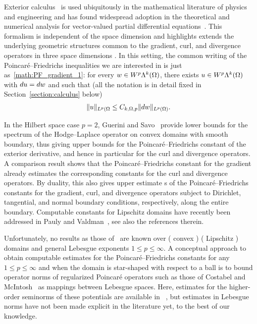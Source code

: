 \documentclass[10pt,letterpaper]{article}
\newcommand\cye[1]{%
  \protect\leavevmode
  \begingroup
    \color{red!35!yellow}%
    #1%
  \endgroup
}
\begin{document}
Exterior calculus~\cite{greub1967multilinear,lee2012smooth} is used ubiquitously in the mathematical literature of physics and engineering and has found widespread adoption in the theoretical and numerical analysis for vector-valued partial differential equations~\cite{hiptmair2002finite, gross2004electromagnetic, arnold2006finite, arnold2009geometric, arnold2010finite, demlow2014posteriori, licht2021local, arnold2021complexes}. 
This formalism is independent of the \cye{space} dimension and highlights \cye{extends the} underlying geometric structures common to the gradient, curl, and divergence operators \cye{in three space dimensions}.
\cye{In this setting, the common writing of the Poincar\'e--Friedrichs inequalities we are interested in is just as~\eqref{math:PF_gradient_1}: for every $w \in W^{p}\Lambda^{k}(\Omega)$, there exists $u \in W^{p}\Lambda^{k}(\Omega)$ with $d u = d w$ and such that (all the notation is in detail fixed in Section~\ref{section:calculus} below)
\begin{align} \label{math:PF_DF} 
    \| u \|_{L^{p}(\Omega} \leq  C_{k,\Omega,p} \| d w \|_{L^{p}(\Omega)}.
\end{align} 
}

In the Hilbert space case $p=2$, Guerini and Savo~\cite{guerini2004eigenvalue} provide lower bounds for the spectrum of the Hodge--Laplace operator on convex domains with smooth boundary, thus giving upper bounds for the Poincar\'e--Friedrichs constant of the exterior derivative, and hence \cye{in particular} for the curl and divergence operators.
\cye{A comparison result} shows that the Poincar\'e--Friedrichs constant for the gradient already estimates the corresponding constants for the curl and divergence operators. By duality, this also \cye{gives} upper estimate\cye{s} of the Poincar\'e--Friedrichs constants for the gradient, curl, and divergence \cye{operators} subject to Dirichlet, tangential, and normal boundary conditions, respectively, along the entire boundary. 
\cye{Computable constants for Lipschitz domains have recently been addressed in Pauly and Valdman~\cite{Paul_Vald_PF_grad_curl_div_20}, see also the references therein.}

Unfortunately, no results as those of~\cite{guerini2004eigenvalue, Paul_Vald_PF_grad_curl_div_20} are known over \cye{(}convex\cye{)} \cye{(}Lipschitz\cye{)} domains and general Lebesgue exponents $1 \leq p \leq \infty$. 
\cye{A conceptual approach to obtain computable} estimates for the Poincar\'e--Friedrichs constants \cye{for any $1 \leq p \leq \infty$} and when the domain is star-shaped with respect to a ball is to bound operator norms of regularized Poincar\'e operators \cye{such as those of} Costabel and McIntosh~\cite{costabel2010bogovskiui} as mappings between Lebesgue spaces. 
Here, estimates for the higher-order seminorms of these potentials \cye{are available in}~\cite{guzman2021estimation}, but estimates in Lebesgue norms have not been made explicit in the literature yet, to the best of our knowledge.
\end{document}
